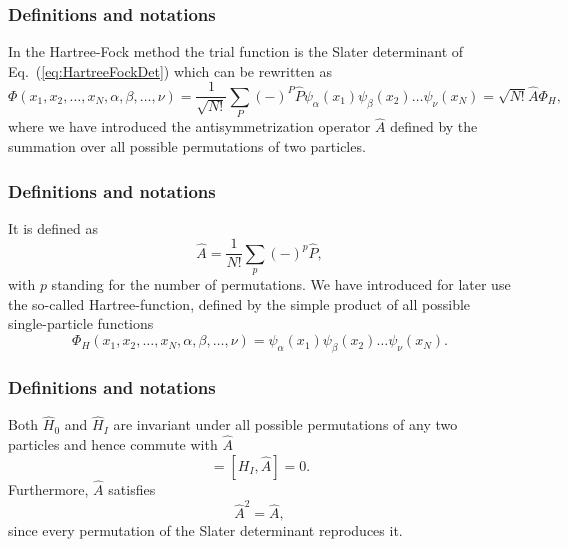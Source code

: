 \documentclass{beamer}
\begin{document}
\begin{frame}
\frametitle{Definitions and notations}

\begin{block}{}
In the Hartree-Fock method the trial function is the Slater
determinant of Eq.~(\ref{eq:HartreeFockDet}) which can be rewritten as 
\[
  \Phi(x_1,x_2,\dots,x_N,\alpha,\beta,\dots,\nu) = \frac{1}{\sqrt{N!}}\sum_{P} (-)^P\hat{P}\psi_{\alpha}(x_1)
    \psi_{\beta}(x_2)\dots\psi_{\nu}(x_N)=\sqrt{N!}\hat{A}\Phi_H,
\]
where we have introduced the antisymmetrization operator $\hat{A}$ defined by the 
summation over all possible permutations of two particles.
\end{block}
\end{frame}

\begin{frame}
\frametitle{Definitions and notations}

\begin{block}{}
It is defined as
\begin{equation}
  \hat{A} = \frac{1}{N!}\sum_{p} (-)^p\hat{P},
\label{antiSymmetryOperator}
\end{equation}
with $p$ standing for the number of permutations. We have introduced for later use the so-called
Hartree-function, defined by the simple product of all possible single-particle functions
\[
  \Phi_H(x_1,x_2,\dots,x_N,\alpha,\beta,\dots,\nu) =
  \psi_{\alpha}(x_1)
    \psi_{\beta}(x_2)\dots\psi_{\nu}(x_N).
\]
\end{block}
\end{frame}

\begin{frame}
\frametitle{Definitions and notations}

\begin{block}{}
Both $\hat{H}_0$ and $\hat{H}_I$ are invariant under all possible permutations of any two particles
and hence commute with $\hat{A}$
\begin{equation}
  [H_0,\hat{A}] = [H_I,\hat{A}] = 0. \label{commutionAntiSym}
\end{equation}
Furthermore, $\hat{A}$ satisfies
\begin{equation}
  \hat{A}^2 = \hat{A},  \label{AntiSymSquared}
\end{equation}
since every permutation of the Slater
determinant reproduces it. 
\end{block}
\end{frame}
\end{document}
